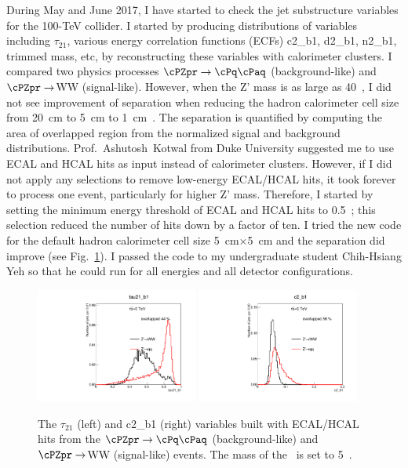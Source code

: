 During May and June 2017, I have started to check the jet substructure variables for the 100-TeV collider. I started by 
producing distributions of variables including $\tau_{21}$, various energy correlation functions (ECFs) c2\_b1, d2\_b1, 
n2\_b1, trimmed mass, etc, by reconstructing these variables with calorimeter clusters. I compared two physics processes 
$\cPZpr\rightarrow \cPq\cPaq$ (background-like) and $\cPZpr\rightarrow$WW (signal-like). 
However, when the Z' mass is as large as 40~\TeV, I did not see improvement of separation when reducing the hadron 
calorimeter cell size from 20~cm to 5~cm to 1~cm~\cite{Eikojsubcluster}. The separation is quantified by computing the 
area of overlapped region from the normalized signal and background distributions. 
Prof.~Ashutosh~Kotwal from Duke University 
suggested me to use ECAL and HCAL hits as input instead of calorimeter clusters. However, if I did not apply any 
selections to remove low-energy ECAL/HCAL hits, it took forever to process one event, particularly for higher Z' mass.
 Therefore, I started by setting the minimum energy threshold of ECAL and HCAL hits to 0.5~\GeV; this selection reduced 
the number of hits down by a factor of ten. I tried the new code for the default hadron calorimeter cell size 
5~cm$\times$5~cm and the separation did improve (see Fig.~\ref{fig:calohit}). I passed the code to my undergraduate 
student Chih-Hsiang Yeh so that he could run for all energies and all detector configurations.

\begin{figure}[htbp]
   \centering
   \includegraphics[width=0.475\textwidth]{tau21.pdf}
   \includegraphics[width=0.475\textwidth]{c2_b1.pdf}
   \caption{The $\tau_{21}$ (left) and c2\_b1 (right) variables built with ECAL/HCAL hits from the $\cPZpr\rightarrow \cPq\cPaq$ (background-like) and $\cPZpr\rightarrow$WW (signal-like) events. The mass of the \cPZpr\ is set to 5~\TeV.}
   \label{fig:calohit}
\end{figure}












